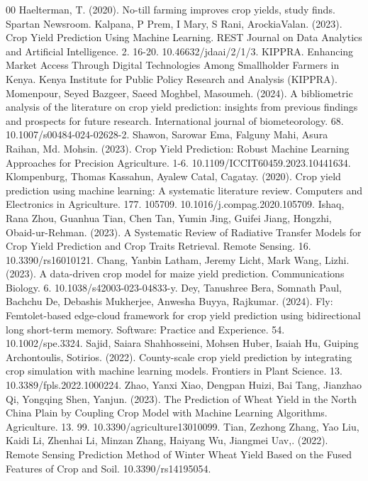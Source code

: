 \documentclass[conference]{IEEEtran}
\begin{document}
\begin{thebibliography}{00}
 Haelterman, T. (2020). No-till farming improves crop yields, study finds. Spartan Newsroom. 
 Kalpana, P Prem, I Mary, S Rani, ArockiaValan. (2023). Crop Yield Prediction Using Machine Learning. REST Journal on Data Analytics and Artificial Intelligence. 2. 16-20. 10.46632/jdaai/2/1/3. 
 KIPPRA. Enhancing Market Access Through Digital Technologies Among Smallholder Farmers in Kenya. Kenya Institute for Public Policy Research and Analysis (KIPPRA).
 Momenpour, Seyed Bazgeer, Saeed Moghbel, Masoumeh. (2024). A bibliometric analysis of the literature on crop yield prediction: insights from previous findings and prospects for future research. International journal of biometeorology. 68. 10.1007/s00484-024-02628-2.
 Shawon, Sarowar Ema, Falguny Mahi, Asura Raihan, Md. Mohsin. (2023). Crop Yield Prediction: Robust Machine Learning Approaches for Precision Agriculture. 1-6. 10.1109/ICCIT60459.2023.10441634. 
 Klompenburg, Thomas Kassahun, Ayalew Catal, Cagatay. (2020). Crop yield prediction using machine learning: A systematic literature review. Computers and Electronics in Agriculture. 177. 105709. 10.1016/j.compag.2020.105709.
 Ishaq, Rana Zhou, Guanhua Tian, Chen Tan, Yumin Jing, Guifei Jiang, Hongzhi, Obaid-ur-Rehman. (2023). A Systematic Review of Radiative Transfer Models for Crop Yield Prediction and Crop Traits Retrieval. Remote Sensing. 16. 10.3390/rs16010121. 
 Chang, Yanbin Latham, Jeremy Licht, Mark Wang, Lizhi. (2023). A data-driven crop model for maize yield prediction. Communications Biology. 6. 10.1038/s42003-023-04833-y. 
 Dey, Tanushree Bera, Somnath Paul, Bachchu De, Debashis Mukherjee, Anwesha Buyya, Rajkumar. (2024). Fly: Femtolet-based edge-cloud framework for crop yield prediction using bidirectional long short-term memory. Software: Practice and Experience. 54. 10.1002/spe.3324.
 Sajid, Saiara Shahhosseini, Mohsen Huber, Isaiah Hu, Guiping Archontoulis, Sotirios. (2022). County-scale crop yield prediction by integrating crop simulation with machine learning models. Frontiers in Plant Science. 13. 10.3389/fpls.2022.1000224. 
 Zhao, Yanxi Xiao, Dengpan Huizi, Bai Tang, Jianzhao Qi, Yongqing Shen, Yanjun. (2023). The Prediction of Wheat Yield in the North China Plain by Coupling Crop Model with Machine Learning Algorithms. Agriculture. 13. 99. 10.3390/agriculture13010099. 
 Tian, Zezhong Zhang, Yao Liu, Kaidi Li, Zhenhai Li, Minzan Zhang, Haiyang Wu, Jiangmei Uav,. (2022). Remote Sensing Prediction Method of Winter Wheat Yield Based on the Fused Features of Crop and Soil. 10.3390/rs14195054. 

\end{thebibliography}
\end{document}
